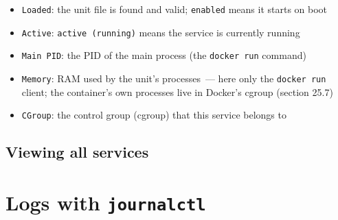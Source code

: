 \begin{itemize}
\tightlist
\item
  \texttt{Loaded}: the unit file is found and valid; \texttt{enabled} means it starts on boot
\item
  \texttt{Active}: \texttt{active\ (running)} means the service is currently running
\item
  \texttt{Main\ PID}: the PID of the main process (the \texttt{docker\ run} command)
\item
  \texttt{Memory}: RAM used by the unit's processes~--- here only the \texttt{docker\ run} client; the container's own processes live in Docker's cgroup (section 25.7)
\item
  \texttt{CGroup}: the control group (cgroup) that this service belongs to
\end{itemize}

\subsection*{Viewing all services}\label{25-process-management:viewing-all-services}

\begin{codebox}[short]

\begin{Shaded}
\begin{Highlighting}[]
\OperatorTok{=}\OperatorTok{=}

\OperatorTok{=}\OperatorTok{=}

\OperatorTok{=}\OperatorTok{=}
\end{Highlighting}
\end{Shaded}

\end{codebox}

\setcounter{section}{3}
\section{\texorpdfstring{Logs with \texttt{journalctl}}{Logs with journalctl}}\label{25-process-management:254-logs-with-journalctl}

